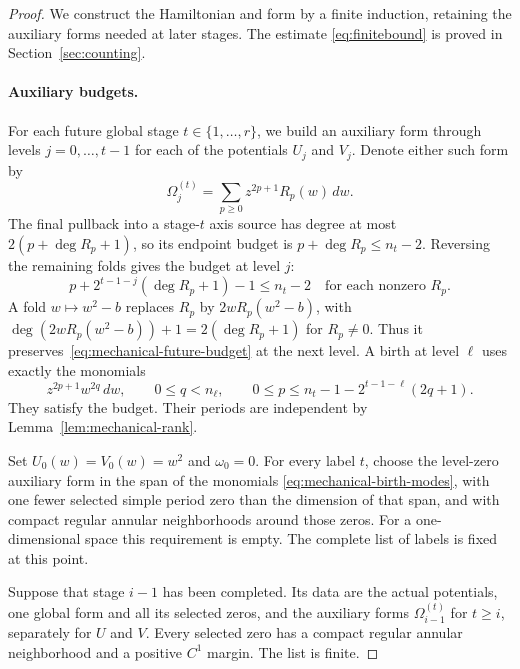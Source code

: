 \begin{proof}
We construct the Hamiltonian and form by a finite induction, retaining
the auxiliary forms needed at later stages. The estimate
\eqref{eq:finitebound} is proved in Section~\ref{sec:counting}.

\paragraph{Auxiliary budgets.}
For each future global stage $t\in\{1,\ldots,r\}$, we build an auxiliary
form through levels $j=0,\ldots,t-1$ for each of the potentials $U_j$
and $V_j$.  Denote either such form by
\[
 \Omega_j^{(t)}=\sum_{p\geq0}z^{2p+1}R_p(w)\,dw.
\]
The final pullback into a stage-$t$ axis source has degree at most
$2(p+\deg R_p+1)$, so its endpoint budget is
$p+\deg R_p\leq n_t-2$.  Reversing the remaining folds gives the
budget at level $j$:
\begin{equation}\label{eq:mechanical-future-budget}
 p+2^{t-1-j}(\deg R_p+1)-1\leq n_t-2
 \quad\text{for each nonzero }R_p.
\end{equation}
A fold $w\mapsto w^2-b$ replaces $R_p$ by
$2wR_p(w^2-b)$, with
$\deg(2wR_p(w^2-b))+1=2(\deg R_p+1)$ for $R_p\ne0$.
Thus it preserves~\eqref{eq:mechanical-future-budget} at
the next level.  A birth at level $\ell$ uses exactly the monomials
\begin{equation}\label{eq:mechanical-birth-modes}
 z^{2p+1}w^{2q}\,dw,\qquad
 0\leq q<n_\ell,\qquad
 0\leq p\leq n_t-1-2^{t-1-\ell}(2q+1).
\end{equation}
They satisfy the budget.  Their periods are independent by
Lemma~\ref{lem:mechanical-rank}.

Set $U_0(w)=V_0(w)=w^2$ and $\omega_0=0$.  For every label $t$,
choose the level-zero auxiliary form in the span of the monomials
\eqref{eq:mechanical-birth-modes}, with one fewer selected simple period
zero than the dimension of that span, and with compact regular annular
neighborhoods around those zeros.  For a one-dimensional
space this requirement is empty.  The complete list of labels is fixed
at this point.

Suppose that stage $i-1$ has been completed.  Its data are the actual
potentials, one global form and all its selected zeros, and the
auxiliary forms $\Omega_{i-1}^{(t)}$ for $t\geq i$, separately for $U$
and $V$.  Every selected zero has a compact regular annular neighborhood
and a positive $C^1$ margin.  The list is finite.


\end{proof}
